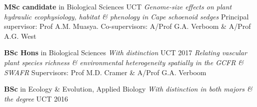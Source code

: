 \begin{hangparas}{2em}{1}

\textbf{MSc candidate} in Biological Sciences \hfill {\small UCT} \break %
\textit{Genome-size effects on plant hydraulic ecophysiology, habitat \&
  phenology in Cape schoenoid sedges} \break
Principal supervisor: Prof A.M. Muasya. Co-supervisors: A/Prof G.A. Verboom
  \& A/Prof A.G. West

\textbf{BSc Hons} in Biological Sciences {\small \textit{With distinction}}
                                                 \hfill {\small UCT 2017} \break
\textit{Relating vascular plant species richness \& environmental heterogeneity
  spatially in the GCFR \& SWAFR} \break
Supervisors: Prof M.D. Cramer \& A/Prof G.A. Verboom

\textbf{BSc} in Ecology \& Evolution, Applied Biology {\small \textit{With
  distinction in both majors \& the degree}}            \hfill {\small UCT 2016}

\end{hangparas}
